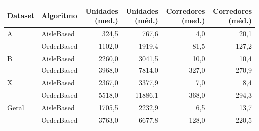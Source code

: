 \small
\begin{tabular}{llrrrr}
\toprule
Dataset & Algoritmo & Unidades (med.) & Unidades (méd.) & Corredores (med.) & Corredores (méd.) \\
\midrule
A & AisleBased & 324,5 & 767,6 & 4,0 & 20,1 \\
 & OrderBased & 1102,0 & 1919,4 & 81,5 & 127,2 \\
B & AisleBased & 2260,0 & 3041,5 & 10,0 & 10,4 \\
 & OrderBased & 3968,0 & 7814,0 & 327,0 & 270,9 \\
X & AisleBased & 2367,0 & 3377,9 & 7,0 & 8,4 \\
 & OrderBased & 5518,0 & 11886,1 & 368,0 & 294,3 \\
Geral & AisleBased & 1705,5 & 2232,9 & 6,5 & 13,7 \\
 & OrderBased & 3763,0 & 6677,8 & 128,0 & 220,5 \\
\bottomrule
\end{tabular}

